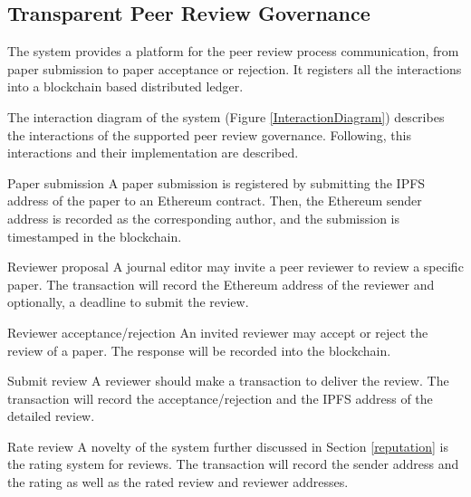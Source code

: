 

\subsection{Transparent Peer Review Governance}
\label{workflow}

The system provides a platform for the peer review process communication, from
paper submission to paper acceptance or rejection. It registers all the
interactions into a blockchain based distributed
ledger. %

The interaction diagram of the system (Figure \ref{InteractionDiagram})
describes the interactions of the supported peer review governance. Following,
this interactions and their implementation are described.


  \begin{LaTeXdescription}
  \item[Paper submission] A paper submission is registered by submitting the
    IPFS address of the paper to an Ethereum contract. Then, the Ethereum sender
    address is recorded as the corresponding author, and the submission is
    timestamped in the blockchain.

  \item[Reviewer proposal] A journal editor may invite a peer reviewer to review
    a specific paper. The transaction will record the Ethereum address of the
    reviewer and optionally, a deadline to submit the review.

  \item[Reviewer acceptance/rejection] An invited reviewer may accept or reject
    the review of a paper. The response will be recorded into the blockchain.

  \item[Submit review] A reviewer should make a transaction to deliver the
    review. The transaction will record the acceptance/rejection and the IPFS
    address of the detailed review.

  \item[Rate review] A novelty of the system further discussed in Section
    \ref{reputation} is the rating system for reviews. The transaction will
    record the sender address and the rating as well as the rated review and
    reviewer addresses.
  \end{LaTeXdescription}

